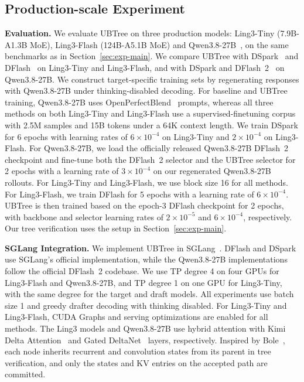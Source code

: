 \subsection{Production-scale Experiment}
\label{sec:exp-production}
\label{sec:exp-serving}

\noindent\textbf{Evaluation.}
We evaluate UBTree on three production models: Ling3-Tiny (7.9B-A1.3B MoE), Ling3-Flash (124B-A5.1B MoE) and Qwen3.8-27B~\citep{qwen38}, on the same benchmarks as in Section~\ref{sec:exp-main}. We compare UBTree with DSpark~\citep{cheng2026dspark} and DFlash~\citep{chen2026dflash} on Ling3-Tiny and Ling3-Flash, and with DSpark and DFlash~2~\citep{inco2026dflash2} on Qwen3.8-27B. We construct target-specific training sets by regenerating responses with Qwen3.8-27B under thinking-disabled decoding. For baseline and UBTree training, Qwen3.8-27B uses OpenPerfectBlend~\citep{xu2024perfect} prompts, whereas all three methods on both Ling3-Tiny and Ling3-Flash use a supervised-finetuning corpus with 2.5M samples and 15B tokens under a 64K context length. We train DSpark for 6 epochs with learning rates of $6\times10^{-4}$ on Ling3-Tiny and $2\times10^{-4}$ on Ling3-Flash. For Qwen3.8-27B, we load the officially released Qwen3.8-27B DFlash~2 checkpoint and fine-tune both the DFlash~2 selector and the UBTree selector for 2 epochs with a learning rate of $3\times10^{-4}$ on our regenerated Qwen3.8-27B rollouts. For Ling3-Tiny and Ling3-Flash, we use block size 16 for all methods. For Ling3-Flash, we train DFlash for 5 epochs with a learning rate of $6\times10^{-4}$. UBTree is then trained based on the epoch-3 DFlash checkpoint for 2 epochs, with backbone and selector learning rates of $2\times10^{-5}$ and $6\times10^{-4}$, respectively. Our tree verification uses the setup in Section~\ref{sec:exp-main}.


\noindent\textbf{SGLang Integration.}
We implement UBTree in SGLang~\citep{zheng2024sglang}. DFlash and DSpark use SGLang's official implementation, while the Qwen3.8-27B implementations follow the official DFlash~2 codebase. We use TP degree 4 on four GPUs for Ling3-Flash and Qwen3.8-27B, and TP degree 1 on one GPU for Ling3-Tiny, with the same degree for the target and draft models. All experiments use batch size 1 and greedy drafter decoding with thinking disabled. For Ling3-Tiny and Ling3-Flash, CUDA Graphs and serving optimizations are enabled for all methods. The Ling3 models and Qwen3.8-27B use hybrid attention with Kimi Delta Attention~\citep{kimi2025linear} and Gated DeltaNet~\citep{yang2024gated} layers, respectively. Inspired by Bole~\citep{wang2026bole}, each node inherits recurrent and convolution states from its parent in tree verification, and only the states and KV entries on the accepted path are committed.

